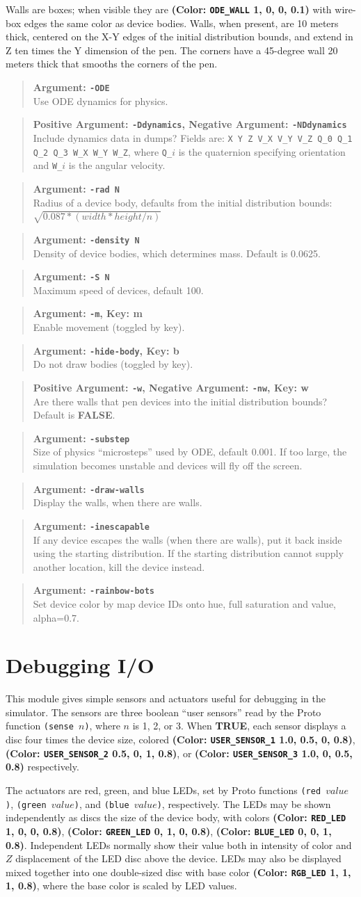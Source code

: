 \documentclass{article}
\newcommand\true{{\bf TRUE}}
\newcommand\false{{\bf FALSE}}
\newcommand\var[1]{{\tt #1}}
\newcommand\key[1]{{\bf #1}}
\newcommand\simarg[2]{\begin{quote} {\bf Argument: \var{#1}} \\ #2 \end{quote}}
\newcommand\simargkey[3]{
  \begin{quote} {\bf Argument: \var{#1}, Key: \key{#2}} \\ #3 \end{quote}
}
\newcommand\simPMarg[3]{
  \begin{quote}
    {\bf Positive Argument: \var{#1}, Negative Argument: \var{#2}} \\ #3
  \end{quote}
}
\newcommand\simPMargkey[4]{
  \begin{quote}
    {\bf Positive Argument: \var{#1}, Negative Argument: \var{#2}, 
      Key: \key{#3}} \\ #4
  \end{quote}
}
\newcommand\color[5]{{\bf (Color: {\tt #1} #2, #3, #4, #5)}} %
\begin{document}
Walls are boxes; when visible they are
\color{ODE\_WALL}{1}{0}{0}{0.1} with wire-box edges the same color as
device bodies.  Walls, when present, are 10 meters thick, centered on
the X-Y edges of the initial distribution bounds, and extend in Z ten
times the Y dimension of the pen.  The corners have a 45-degree wall
20 meters thick that smooths the corners of the pen.

\simarg{-ODE}{Use ODE dynamics for physics.}
\simPMarg{-Ddynamics}{-NDdynamics}{Include dynamics data in dumps?
  Fields are: \var{X Y Z V\_X V\_Y V\_Z Q\_0 Q\_1 Q\_2 Q\_3 W\_X W\_Y W\_Z},
  where \var{Q\_$i$} is the quaternion specifying orientation and 
  \var{W\_$i$} is the angular velocity.}
\simarg{-rad N}{Radius of a device body, defaults from the initial
  distribution bounds: $\sqrt{0.087*(width*height/n)}$}
\simarg{-density N}{Density of device bodies, which determines mass.  
  Default is 0.0625.}
\simarg{-S N}{Maximum speed of devices, default 100.}
\simargkey{-m}{m}{Enable movement (toggled by key).}
\simargkey{-hide-body}{b}{Do not draw bodies (toggled by key).}
\simPMargkey{-w}{-nw}{w}{Are there walls that pen devices into
  the initial distribution bounds?  Default is \false{}.}
\simarg{-substep}{Size of physics ``microsteps'' used by ODE, default
  0.001.  If too large, the simulation becomes unstable and devices
  will fly off the screen.}
\simarg{-draw-walls}{Display the walls, when there are walls.}
\simarg{-inescapable}{If any device escapes the walls (when there are
  walls), put it back inside using the starting distribution.  If the
  starting distribution cannot supply another location, kill the
  device instead.}
\simarg{-rainbow-bots}{Set device color by map device IDs onto hue,
  full saturation and value, alpha=0.7.}


\section{Debugging I/O}

This module gives simple sensors and actuators useful for debugging in
the simulator.  The sensors are three boolean ``user sensors'' read by
the Proto function \var{(sense $n$)}, where $n$ is 1, 2, or 3.  When
\true{}, each sensor displays a disc four times the device size,
colored \color{USER\_SENSOR\_1}{1.0}{0.5}{0}{0.8},
\color{USER\_SENSOR\_2}{0.5}{0}{1}{0.8}, or
\color{USER\_SENSOR\_3}{1.0}{0}{0.5}{0.8} respectively.

The actuators are red, green, and blue LEDs, set by Proto functions
\var{(red $value$)}, \var{(green $value$)}, and \var{(blue $value$)},
respectively.  The LEDs may be shown independently as discs the size
of the device body, with colors \color{RED\_LED}{1}{0}{0}{0.8},
\color{GREEN\_LED}{0}{1}{0}{0.8}, \color{BLUE\_LED}{0}{0}{1}{0.8}.
Independent LEDs normally show their value both in intensity of color
and $Z$ displacement of the LED disc above the device.  LEDs may also
be displayed mixed together into one double-sized disc with base color
\color{RGB\_LED}{1}{1}{1}{0.8}, where the base color is scaled by LED
values.
\end{document}
